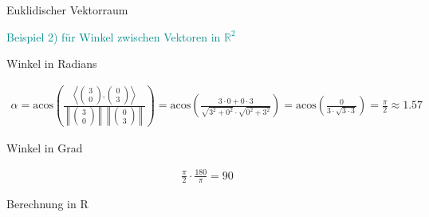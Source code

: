 \documentclass[
  8pt,
  ignorenonframetext,
]{beamer}
\begin{document}
\begin{frame}[fragile]{Euklidischer Vektorraum}
\protect\hypertarget{euklidischer-vektorraum-11}{}
\vspace{3mm}

\textcolor{darkcyan}{Beispiel 2) für Winkel zwischen Vektoren in $\mathbb{R}^2$}

\vspace{6pt}
\small

Winkel in Radians

\footnotesize

\begin{align*}
\alpha = \mbox{acos}  \left ( \frac{\left \langle \begin{pmatrix} 3\\0 \end{pmatrix}, \begin{pmatrix} 0\\3 \end{pmatrix} \right \rangle}{\left \lVert \begin{pmatrix}3\\0\end{pmatrix}\right \rVert \left \lVert\begin{pmatrix}0\\3\end{pmatrix}\right \rVert}\right)
= \mbox{acos}\left(\frac{3 \cdot 0 + 0 \cdot 3}{\sqrt{3^2 + 0^2} \cdot \sqrt{0^2 + 3^2}}\right)
= \mbox{acos}\left(\frac{0}{3 \cdot \sqrt{3\cdot 3}}\right)
= \frac{\pi}{2} \approx 1.57
\end{align*}

\vspace{6pt}
\small

Winkel in Grad

\footnotesize

\begin{align*}
\frac{\pi}{2} \cdot \frac{180}{\pi} = 90
\end{align*}

\small

Berechnung in R \footnotesize


\end{frame}
\end{document}
